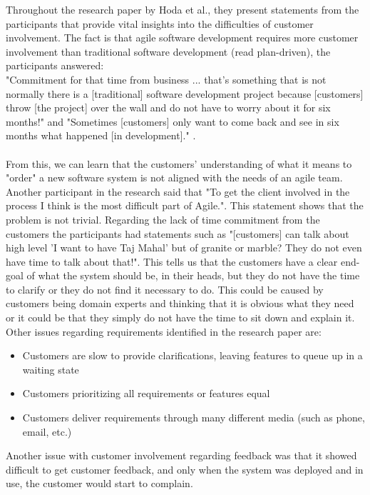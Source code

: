 Throughout the research paper by Hoda et al., they present statements from the participants that provide vital insights into the difficulties of customer involvement.
The fact is that agile software development requires more customer involvement than traditional software development (read plan-driven), the participants answered: \\
"Commitment for that time from business ... that's something that is not normally there is a [traditional] software development project because [customers] throw [the project] over the wall and do not have to worry about it for six months!" and "Sometimes [customers] only want to come back and see in six months what happened [in development]." \cite{Hoda2011TheIO}. \\ \\
From this, we can learn that the customers' understanding of what it means to "order" a new software system is not aligned with the needs of an agile team.
Another participant in the research said that "To get the client involved in the process I think is the most difficult part of Agile."\cite{Hoda2011TheIO}.
This statement shows that the problem is not trivial.
Regarding the lack of time commitment from the customers the participants had statements such as "[customers] can talk about high level 'I want to have Taj Mahal' but of granite or marble? They do not even have time to talk about that!"\cite{Hoda2011TheIO}.
This tells us that the customers have a clear end-goal of what the system should be, in their heads, but they do not have the time to clarify or they do not find it necessary to do.
This could be caused by customers being domain experts and thinking that it is obvious what they need or it could be that they simply do not have the time to sit down and explain it.
Other issues regarding requirements identified in the research paper are:
\begin{itemize}
 \item Customers are slow to provide clarifications, leaving features to queue up in a waiting state
 \item Customers prioritizing all requirements or features equal
 \item Customers deliver requirements through many different media (such as phone, email, etc.)
\end{itemize}

Another issue with customer involvement regarding feedback was that it showed difficult to get customer feedback, and only when the system was deployed and in use, the customer would start to complain.

